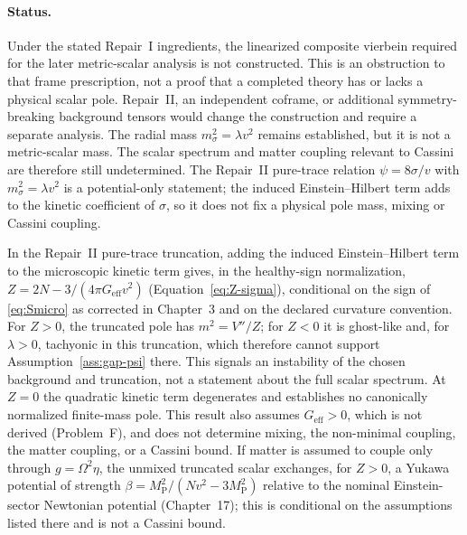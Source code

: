 \paragraph{Status.}
Under the stated Repair~I ingredients, the linearized composite
vierbein required for the later metric-scalar analysis is not
constructed. This is an obstruction to that frame prescription, not
a proof that a completed theory has or lacks a physical scalar pole.
Repair~II, an independent coframe, or additional symmetry-breaking
background tensors would change the construction and require a
separate analysis. The radial mass \(m_\sigma^2=\lambda v^2\) remains
established, but it is not a metric-scalar mass. The scalar spectrum
and matter coupling relevant to Cassini are therefore still
undetermined. The Repair~II pure-trace relation \(\psi=8\sigma/v\)
with \(m_\sigma^2=\lambda v^2\) is a potential-only statement; the
induced Einstein--Hilbert term adds to the kinetic coefficient of
\(\sigma\), so it does not fix a physical pole mass, mixing or
Cassini coupling.

In the Repair~II pure-trace truncation, adding the induced
Einstein--Hilbert term to the microscopic kinetic term gives, in the
healthy-sign normalization,
\(Z=2N-3/(4\pi G_{\mathrm{eff}}v^{2})\)
(Equation~\ref{eq:Z-sigma}), conditional on the sign of
\eqref{eq:Smicro} as corrected in Chapter~3 and on the declared
curvature convention. For \(Z>0\), the truncated pole has
\(m^{2}=V''/Z\); for \(Z<0\) it is ghost-like and, for \(\lambda>0\),
tachyonic in this truncation, which therefore cannot support
Assumption~\ref{ass:gap-psi} there. This signals an instability of the
chosen background and truncation, not a statement about the full scalar
spectrum. At \(Z=0\) the quadratic kinetic
term degenerates and establishes no canonically normalized
finite-mass pole. This result also assumes \(G_{\mathrm{eff}}>0\),
which is not derived (Problem~F), and does not determine mixing, the
non-minimal coupling, the matter coupling, or a Cassini bound.
If matter is assumed to couple only through \(g=\Omega^2\eta\), the
unmixed truncated scalar exchanges, for \(Z>0\), a Yukawa potential of
strength \(\beta=M_{\mathrm P}^{2}/(Nv^{2}-3M_{\mathrm P}^{2})\)
relative to the nominal Einstein-sector Newtonian potential
(Chapter~17); this is conditional on the assumptions listed there and
is not a Cassini bound.

